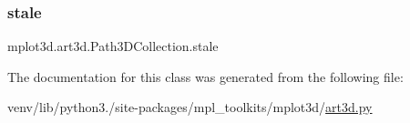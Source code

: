 \subsubsection{\texorpdfstring{stale}{stale}}
{\footnotesize\ttfamily mplot3d.\+art3d.\+Path3\+D\+Collection.\+stale}



The documentation for this class was generated from the following file\+:\begin{DoxyCompactItemize}
\item 
venv/lib/python3./site-\/packages/mpl\+\_\+toolkits/mplot3d/\hyperlink{art3d_8py}{art3d.\+py}\end{DoxyCompactItemize}
